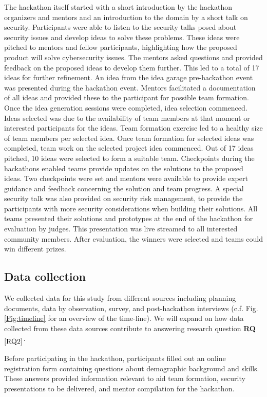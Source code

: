 \documentclass[runningheads]{llncs}
\newcommand{\hr}[1]{\textbf{RQ}$_{\ref{#1}}$}
\begin{document}
The hackathon itself started with a short introduction by the hackathon organizers and mentors and an introduction to the domain by a short talk on security. Participants were able to listen to the security talks posed about security issues and develop ideas to solve these problems. These ideas were pitched to mentors and fellow participants, highlighting how the proposed product will solve cybersecurity issues. The mentors asked questions and provided feedback on the proposed ideas to develop them further. This led to a total of 17 ideas for further refinement. An idea from the idea  garage pre-hackathon event was presented during the hackathon event. Mentors facilitated a documentation of all ideas and provided these to the participant for possible team formation. Once the idea generation sessions were completed, idea selection commenced. Ideas selected was due to the availability of team members at that moment or interested participants for the ideas. 
Team formation exercise led to a healthy size of team members per selected idea. Once team formation for selected ideas was completed, team work on the selected project idea commenced. Out of 17 ideas pitched, 10 ideas were selected to form a suitable team. Checkpoints during the hackathons enabled teams provide updates on the solutions to the proposed ideas. Two checkpoints were set and mentors were available to provide expert guidance and feedback concerning the solution and team progress. A special security talk was also provided on security risk management, to provide the participants with more security considerations when building their solutions. 
All teams presented their solutions and prototypes at the end of the hackathon for evaluation by judges. This presentation was live streamed to all interested community members. After evaluation, the winners were selected and teams could win different prizes. 

\subsection{Data collection}
We collected data for this study from different sources including planning documents, data by observation, survey, and post-hackathon interviews (c.f. Fig. \ref{Fig:timeline} for an overview of the time-line).  We will expand on how data collected from these data sources contribute to answering research question \hr{RQ2}. %

Before participating in the hackathon, participants filled out an online registration form containing questions about demographic background and skills. %
These answers provided information relevant to aid team formation, security presentations to be delivered, and mentor compilation for the hackathon.
\end{document}
